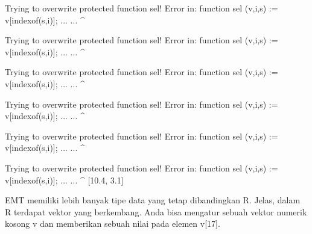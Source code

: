 \documentclass[a4paper,10pt]{article}
\begin{document}
\begin{eulernotebook}
\begin{eulercomment}
\begin{eulercomment}
\begin{eulercomment}
\begin{eulercomment}
\begin{eulercomment}
\begin{eulercomment}
\begin{eulercomment}
\begin{eulercomment}
\begin{eulercomment}
\begin{eulercomment}
\begin{eulercomment}
\begin{eulercomment}
\begin{eulercomment}
\begin{eulercomment}
\begin{eulercomment}
\begin{eulercomment}
\begin{eulercomment}
\begin{eulercomment}
\begin{eulercomment}
\begin{eulercomment}
\begin{eulercomment}
\begin{eulercomment}
\begin{eulercomment}
\begin{eulercomment}
\begin{eulercomment}
\begin{eulercomment}
\begin{eulercomment}
\begin{eulercomment}
\begin{eulercomment}
\begin{eulercomment}
\begin{eulercomment}
\begin{eulercomment}
\begin{eulercomment}
\begin{eulercomment}
\begin{eulercomment}
\begin{eulercomment}
\begin{eulercomment}
\begin{eulercomment}
\begin{eulercomment}
\begin{eulercomment}
\begin{eulercomment}
\begin{eulercomment}
\begin{eulercomment}
\begin{eulercomment}
\begin{eulercomment}
\begin{eulercomment}
\begin{eulercomment}
\begin{eulercomment}
\begin{euleroutput}
  Trying to overwrite protected function sel!
  Error in:
  function sel (v,i,s) := v[indexof(s,i)]; ... ...
               ^
  
  Trying to overwrite protected function sel!
  Error in:
  function sel (v,i,s) := v[indexof(s,i)]; ... ...
               ^
  
  Trying to overwrite protected function sel!
  Error in:
  function sel (v,i,s) := v[indexof(s,i)]; ... ...
               ^
  
  Trying to overwrite protected function sel!
  Error in:
  function sel (v,i,s) := v[indexof(s,i)]; ... ...
               ^
  
  Trying to overwrite protected function sel!
  Error in:
  function sel (v,i,s) := v[indexof(s,i)]; ... ...
               ^
  
  Trying to overwrite protected function sel!
  Error in:
  function sel (v,i,s) := v[indexof(s,i)]; ... ...
               ^
  [10.4,  3.1]
\end{euleroutput}
\begin{eulercomment}
EMT memiliki lebih banyak tipe data yang tetap dibandingkan R. Jelas,
dalam R terdapat vektor yang berkembang. Anda bisa mengatur sebuah
vektor numerik kosong v dan memberikan sebuah nilai pada elemen v[17].

\end{eulercomment}
\end{eulercomment}
\end{eulercomment}
\end{eulercomment}
\end{eulercomment}
\end{eulercomment}
\end{eulercomment}
\end{eulercomment}
\end{eulercomment}
\end{eulercomment}
\end{eulercomment}
\end{eulercomment}
\end{eulercomment}
\end{eulercomment}
\end{eulercomment}
\end{eulercomment}
\end{eulercomment}
\end{eulercomment}
\end{eulercomment}
\end{eulercomment}
\end{eulercomment}
\end{eulercomment}
\end{eulercomment}
\end{eulercomment}
\end{eulercomment}
\end{eulercomment}
\end{eulercomment}
\end{eulercomment}
\end{eulercomment}
\end{eulercomment}
\end{eulercomment}
\end{eulercomment}
\end{eulercomment}
\end{eulercomment}
\end{eulercomment}
\end{eulercomment}
\end{eulercomment}
\end{eulercomment}
\end{eulercomment}
\end{eulercomment}
\end{eulercomment}
\end{eulercomment}
\end{eulercomment}
\end{eulercomment}
\end{eulercomment}
\end{eulercomment}
\end{eulercomment}
\end{eulercomment}
\end{eulercomment}
\end{eulernotebook}
\end{document}

